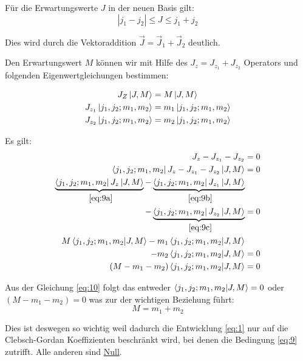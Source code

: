 Für die Erwartungswerte \(J\) in der neuen Basis gilt:
\begin{equation}
  \label{eq:8}
  \boxed{|j_1-j_2|\leq J\leq j_1+j_2}
\end{equation}

Dies wird durch die Vektoraddition \(\vec J = \vec J_1+\vec J_2\) deutlich.

Den Erwartungswert \(M\) können wir mit Hilfe des \(J_z=J_{z_1}+J_{z_2}\)
Operators und folgenden Eigenwertgleichungen bestimmen:

\begin{subequations}
  \begin{align}
    J_Z\left| J,M \right\rangle&= M \left| J,M \right\rangle \label{eq:9a}\\
    J_{z_1}\left| j_1,j_2;m_1,m_2 \right\rangle&=m_1\left| j_1,j_2;m_1,m_2 \right\rangle \label{eq:9b}\\
    J_{z_2}\left| j_1,j_2;m_1,m_2 \right\rangle&=m_2\left| j_1,j_2;m_1,m_2 \right\rangle \label{eq:9c}
  \end{align}
\end{subequations}

Es gilt:
\begin{align}
  \label{eq:10}
  J_z-J_{z_1}-J_{z_2}&=0\notag\\
  \bra{j_1,j_2;m_1,m_2} J_z-J_{z_1}-J_{z_2} \ket{J,M} &=0\notag\\
  \underbrace{\bra{j_1,j_2;m_1,m_2} J_z\ket{J,M}}_{~\eqref{eq:9a}}
  -\underbrace{\bra{j_1,j_2;m_1,m_2}J_{z_1}\ket{J,M}}_{~\eqref{eq:9b}}\notag\\
  -\underbrace{\bra{j_1,j_2;m_1,m_2}J_{z_2} \ket{J,M}}_{~\eqref{eq:9c}}&=0\notag\\
  M\braket{j_1,j_2;m_1,m_2}{J,M}
  -m_1\braket{j_1,j_2;m_1,m_2}{J,M}\notag\\
  -m_2\braket{j_1,j_2;m_1,m_2}{J,M}&=0\notag\\
  (M-m_1-m_2)\braket{j_1,j_2;m_1,m_2}{J,M}&=0
\end{align}

Aus der Gleichung \eqref{eq:10} folgt das entweder
\(\braket{j_1,j_2;m_1,m_2}{J,M}=0\) oder\\ 
\((M-m_1-m_2)=0\) was zur der wichtigen Beziehung führt:
\begin{equation}
  \label{eq:9}
  \boxed{M=m_1+m_2}
\end{equation}

Dies ist deswegen so wichtig weil dadurch die Entwicklung \eqref{eq:1} nur
auf die Clebsch-Gordan Koeffizienten beschränkt wird, bei denen die Bedingung
\eqref{eq:9} zutrifft. Alle anderen sind \underline{Null}. 

